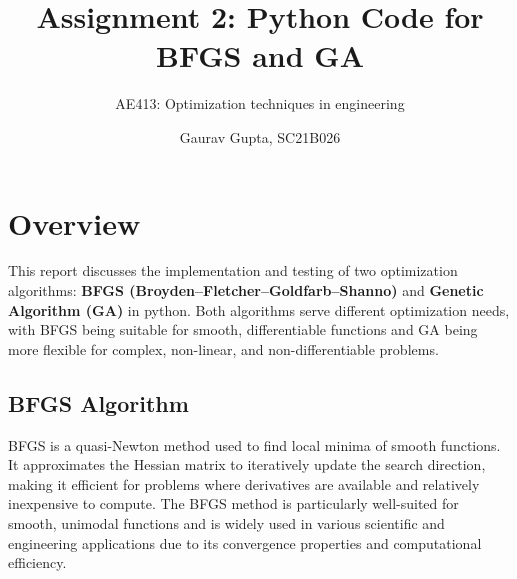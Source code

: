 \documentclass[12pt,a4paper,oneside]{paper} %
\title{Assignment 2: Python Code for BFGS and GA}
\subtitle{AE413: Optimization techniques in engineering}
\author{Gaurav Gupta, SC21B026}
\begin{document}
\maketitle


\section{Overview}

This report discusses the implementation and testing of two optimization algorithms: \textbf{BFGS (Broyden–Fletcher–Goldfarb–Shanno)} and \textbf{Genetic Algorithm (GA)} in python. Both algorithms serve different optimization needs, with BFGS being suitable for smooth, differentiable functions and GA being more flexible for complex, non-linear, and non-differentiable problems.

\subsection*{BFGS Algorithm}

BFGS is a quasi-Newton method used to find local minima of smooth functions. It approximates the Hessian matrix to iteratively update the search direction, making it efficient for problems where derivatives are available and relatively inexpensive to compute. The BFGS method is particularly well-suited for smooth, unimodal functions and is widely used in various scientific and engineering applications due to its convergence properties and computational efficiency.
\end{document}
